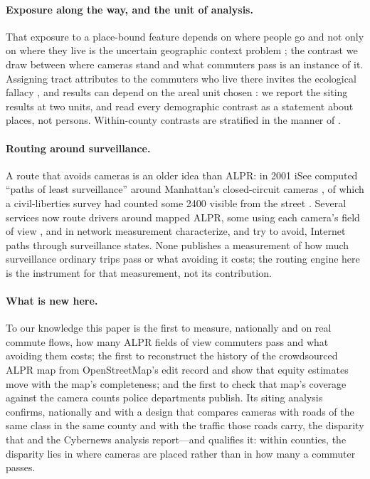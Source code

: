 \documentclass[11pt,twoside]{article}
\newcommand{\alpr}{ALPR\xspace}
\begin{document}
\paragraph{Exposure along the way, and the unit of analysis.} That exposure to a place-bound
feature depends on where people go and not only on where they live is the uncertain geographic
context problem \citep{kwan2012}; the contrast we draw between where cameras stand and what
commuters pass is an instance of it. Assigning tract attributes to the commuters who live there
invites the ecological fallacy \citep{robinson1950}, and results can depend on the areal unit
chosen \citep{openshaw1984}: we report the siting results at two units, and read every
demographic contrast as a statement about places, not persons. Within-county contrasts are
stratified in the manner of \citet{mantel1959}.

\paragraph{Routing around surveillance.} A route that avoids cameras is an older idea than
\alpr: in 2001 iSee computed ``paths of least surveillance'' around Manhattan's closed-circuit
cameras \citep{isee2001,schienke2002}, of which a civil-liberties survey had counted some
\num{2400} visible from the street \citep{nyclu2006}. Several services now route drivers around mapped
\alpr, some using each camera's field of view \citep{deflockmaps,flockhopper,banditkin,driversagainstflock},
and in network measurement \citet{edmundson2016} characterize, and try to avoid, Internet paths
through surveillance states. None publishes a measurement of how much surveillance ordinary
trips pass or what avoiding it costs; the routing engine here is the instrument for that
measurement, not its contribution.

\paragraph{What is new here.} To our knowledge this paper is the first to measure, nationally
and on real commute flows, how many \alpr fields of view commuters pass and what avoiding them
costs; the first to reconstruct the history of the crowdsourced \alpr map from OpenStreetMap's
edit record and show that equity estimates move with the map's completeness; and the first to
check that map's coverage against the camera counts police departments publish. Its siting analysis confirms,
nationally and with a design that compares cameras with roads of the same class in the same
county and with the traffic those roads carry, the disparity that \citet{keener2026} and the
Cybernews analysis \citep{cybernews2026} report---and qualifies it: within counties, the disparity lies in where cameras are placed rather than in how many a
commuter passes.
\end{document}
